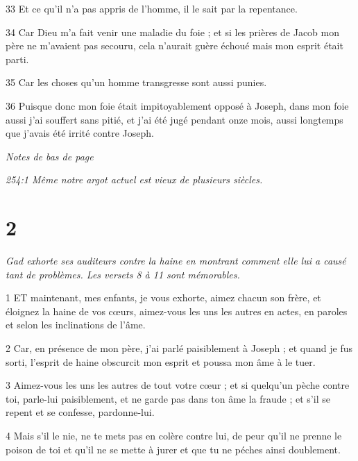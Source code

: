 \par 33 Et ce qu'il n'a pas appris de l'homme, il le sait par la repentance.

\par 34 Car Dieu m'a fait venir une maladie du foie ; et si les prières de Jacob mon père ne m'avaient pas secouru, cela n'aurait guère échoué mais mon esprit était parti.

\par 35 Car les choses qu'un homme transgresse sont aussi punies.

\par 36 Puisque donc mon foie était impitoyablement opposé à Joseph, dans mon foie aussi j'ai souffert sans pitié, et j'ai été jugé pendant onze mois, aussi longtemps que j'avais été irrité contre Joseph.

\par \textit{Notes de bas de page}

\par \textit{254:1 Même notre argot actuel est vieux de plusieurs siècles.}

\chapter{2}

\par \textit{Gad exhorte ses auditeurs contre la haine en montrant comment elle lui a causé tant de problèmes. Les versets 8 à 11 sont mémorables.}

\par 1 ET maintenant, mes enfants, je vous exhorte, aimez chacun son frère, et éloignez la haine de vos cœurs, aimez-vous les uns les autres en actes, en paroles et selon les inclinations de l'âme.

\par 2 Car, en présence de mon père, j'ai parlé paisiblement à Joseph ; et quand je fus sorti, l'esprit de haine obscurcit mon esprit et poussa mon âme à le tuer.

\par 3 Aimez-vous les uns les autres de tout votre cœur ; et si quelqu'un pèche contre toi, parle-lui paisiblement, et ne garde pas dans ton âme la fraude ; et s'il se repent et se confesse, pardonne-lui.

\par 4 Mais s'il le nie, ne te mets pas en colère contre lui, de peur qu'il ne prenne le poison de toi et qu'il ne se mette à jurer et que tu ne péches ainsi doublement.

